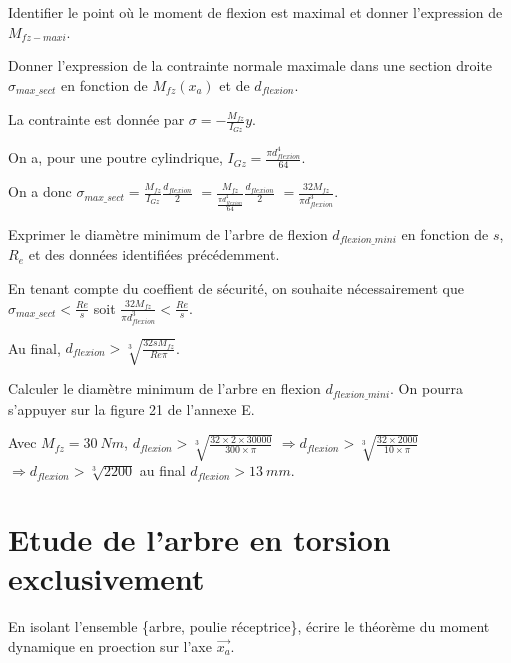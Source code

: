 \documentclass[11pt]{article}
\begin{document}
\UPSTIquestion Identifier le point où le moment de flexion est maximal et donner l'expression de $M_{fz-maxi}$.
\begin{UPSTIcorrige}
\end{UPSTIcorrige}

\UPSTIquestion Donner l'expression de la contrainte normale maximale dans une section droite $\sigma_{max\_sect}$ en fonction de $M_{fz}(x_a)$ et de $d_{flexion}$.

\begin{UPSTIcorrige}
La contrainte est donnée par $\sigma = -\frac{M_{fz}}{I_{Gz}}y$.

On a, pour une poutre cylindrique, $I_{Gz} = \frac{\pi d_{flexion}^4}{64} $. 

On a donc $\sigma_{max\_sect} = \frac{M_{fz}}{I_{Gz}} \frac{d_{flexion}}{2}$ 
$= \frac{M_{fz}}{\frac{\pi d_{flexion}^4}{64}} \frac{d_{flexion}}{2}$
$= \frac{32 M_{fz}}{\pi d_{flexion}^3} $.
\end{UPSTIcorrige}

\UPSTIquestion Exprimer le diamètre minimum de l'arbre de flexion $d_{flexion\_mini}$ en fonction de $s$, $R_e$ et des données identifiées précédemment. 

\begin{UPSTIcorrige}
En tenant compte du coeffient de sécurité, on souhaite nécessairement que 
$\sigma_{max\_sect} < \frac{Re}{s}$ soit $ \frac{32 M_{fz}}{\pi d_{flexion}^3}  < \frac{Re}{s}$.

Au final,  $d_{flexion}> \sqrt[3]{\frac{32 s M_{fz}}{Re \pi }} $.

\end{UPSTIcorrige}

\UPSTIquestion Calculer le diamètre minimum de l'arbre en flexion $d_{flexion\_mini}$. On pourra s'appuyer sur la figure 21 de l'annexe E. 

\begin{UPSTIcorrige}
Avec $ M_{fz} = \SI{30}{Nm}$, $d_{flexion}> \sqrt[3]{\frac{32 \times 2 \times 30 000}{300 \times \pi }} $ 
$ \Rightarrow d_{flexion}> \sqrt[3]{\frac{32 \times 2000 }{10 \times \pi }} $
$ \Rightarrow d_{flexion}> \sqrt[3]{2200} $ au final $d_{flexion}> \SI{13}{mm}$.

\end{UPSTIcorrige}


\section{Etude de l'arbre en torsion exclusivement}
\UPSTIquestion* En isolant l'ensemble \{arbre, poulie réceptrice\}, écrire le théorème du moment dynamique en proection sur l'axe $\overrightarrow{x_a}$.
\end{document}
